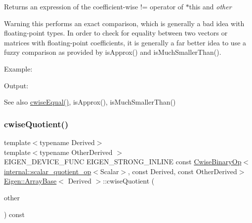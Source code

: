 \begin{DoxyReturn}{Returns}
an expression of the coefficient-\/wise != operator of $\ast$this and {\itshape other} 
\end{DoxyReturn}
\begin{DoxyWarning}{Warning}
this performs an exact comparison, which is generally a bad idea with floating-\/point types. In order to check for equality between two vectors or matrices with floating-\/point coefficients, it is generally a far better idea to use a fuzzy comparison as provided by is\+Approx() and is\+Much\+Smaller\+Than().
\end{DoxyWarning}
Example\+: 
\begin{DoxyCodeInclude}{0}
\end{DoxyCodeInclude}
 Output\+: 
\begin{DoxyVerbInclude}
\end{DoxyVerbInclude}


\begin{DoxySeeAlso}{See also}
\mbox{\hyperlink{class_eigen_1_1_array_base_a5bce24aa0762399c48cde7777c21c9e2}{cwise\+Equal()}}, is\+Approx(), is\+Much\+Smaller\+Than() 
\end{DoxySeeAlso}
\mbox{\label{class_eigen_1_1_array_base_a91636e129a14395905c9bd76d7141c55}} 
\subsubsection{\texorpdfstring{cwiseQuotient()}{cwiseQuotient()}}
{\footnotesize\ttfamily template$<$typename Derived$>$ \\
template$<$typename Other\+Derived $>$ \\
E\+I\+G\+E\+N\+\_\+\+D\+E\+V\+I\+C\+E\+\_\+\+F\+U\+NC E\+I\+G\+E\+N\+\_\+\+S\+T\+R\+O\+N\+G\+\_\+\+I\+N\+L\+I\+NE const \mbox{\hyperlink{class_eigen_1_1_cwise_binary_op}{Cwise\+Binary\+Op}}$<$\mbox{\hyperlink{struct_eigen_1_1internal_1_1scalar__quotient__op}{internal\+::scalar\+\_\+quotient\+\_\+op}}$<$Scalar$>$, const Derived, const Other\+Derived$>$ \mbox{\hyperlink{class_eigen_1_1_array_base}{Eigen\+::\+Array\+Base}}$<$ Derived $>$\+::cwise\+Quotient (\begin{DoxyParamCaption}\item[{const E\+I\+G\+E\+N\+\_\+\+C\+U\+R\+R\+E\+N\+T\+\_\+\+S\+T\+O\+R\+A\+G\+E\+\_\+\+B\+A\+S\+E\+\_\+\+C\+L\+A\+SS$<$ Other\+Derived $>$ \&}]{other }\end{DoxyParamCaption}) const\hspace{0.3cm}{\ttfamily [inline]}}

